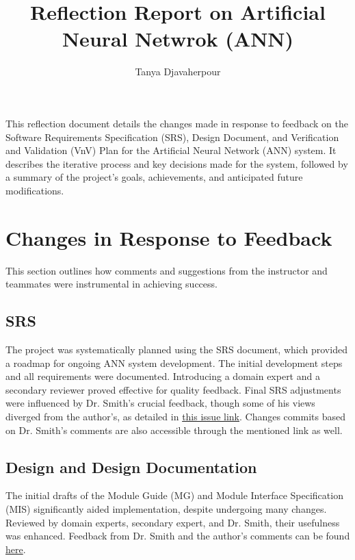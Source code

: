 \documentclass{article}
\title{Reflection Report on Artificial Neural Netwrok (ANN)}
\author{Tanya Djavaherpour}
\date{}
\begin{document}
\maketitle

This reflection document details the changes made in response to 
feedback on the Software Requirements Specification (SRS), Design 
Document, and Verification and Validation (VnV) Plan for the 
Artificial Neural Network (ANN) system. It describes the iterative 
process and key decisions made for the system, followed by a summary 
of the project’s goals, achievements, and anticipated future modifications.

\section{Changes in Response to Feedback}

This section outlines how comments and suggestions from the instructor and 
teammates were instrumental in achieving success.

\subsection{SRS}

The project was systematically planned using the SRS document, which provided 
a roadmap for ongoing ANN system development. The initial development steps 
and all requirements were documented. Introducing a domain expert and a 
secondary reviewer proved effective for quality feedback. Final SRS 
adjustments were influenced by Dr. Smith's crucial feedback, though 
some of his views diverged from the author's, as detailed in
\href{https://github.com/tanya-jp/ANN-CAS741/issues/4}{this issue link}. 
Changes commits based on Dr. Smith's comments are also accessible through the mentioned link as well.

\subsection{Design and Design Documentation}
The initial drafts of the Module Guide (MG) and Module Interface Specification 
(MIS) significantly aided implementation, despite undergoing many changes. 
Reviewed by domain experts, secondary expert, and Dr. Smith, their usefulness 
was enhanced. Feedback from Dr. Smith and the author's comments can be 
found \href{https://github.com/tanya-jp/ANN-CAS741/issues/21}{here}.

\end{document}

